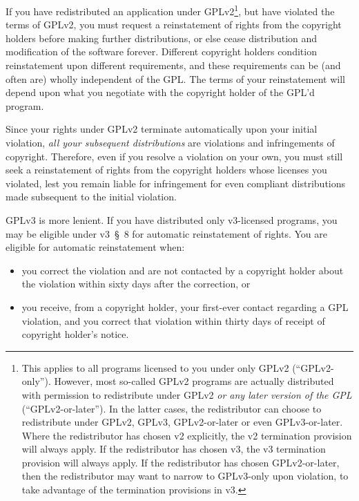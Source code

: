 If you have redistributed an application under GPLv2\footnote{This applies
  to all programs licensed to you under only GPLv2 (``GPLv2-only'').
  However, most so-called GPLv2 programs are actually distributed with
  permission to redistribute under GPLv2 \emph{or any later version of the
    GPL} (``GPLv2-or-later'').  In the latter cases, the redistributor can
  choose to redistribute under GPLv2, GPLv3, GPLv2-or-later or even
  GPLv3-or-later.  Where the redistributor has chosen v2 explicitly, the
  v2 termination provision will always apply.  If the redistributor has
  chosen v3, the v3 termination provision will always apply.  If the
  redistributor has chosen GPLv2-or-later, then the redistributor may want
  to narrow to GPLv3-only upon violation, to take advantage of the
  termination provisions in v3.}, but have violated the terms of GPLv2,
you must request a reinstatement of rights from the copyright holders
before making further distributions, or else cease distribution and
modification of the software forever.  Different copyright holders
condition reinstatement upon different requirements, and these
requirements can be (and often are) wholly independent of the GPL\@.  The
terms of your reinstatement will depend upon what you negotiate with the
copyright holder of the GPL'd program.

Since your rights under GPLv2 terminate automatically upon your initial
violation, \emph{all your subsequent distributions} are violations and
infringements of copyright.  Therefore, even if you resolve a violation on
your own, you must still seek a reinstatement of rights from the copyright
holders whose licenses you violated, lest you remain liable for
infringement for even compliant distributions made subsequent to the
initial violation.

GPLv3 is more lenient.  If you have distributed only v3-licensed programs,
you may be eligible under v3~\S~8 for automatic reinstatement of rights.
You are eligible for automatic reinstatement when:
\begin{itemize}
\item you correct the violation and are not contacted by a copyright
  holder about the violation within sixty days after the correction, or

\item you receive, from a copyright holder, your first-ever contact
  regarding a GPL violation, and you correct that violation within thirty
  days of receipt of copyright holder's notice.
\end{itemize}

